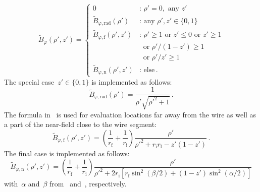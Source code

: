\begin{equation}
  \tilde{B}_\varphi (\rho', z') =
  \begin{cases}
    0                                            &:\, \rho' = 0 , \textrm{ any } z'      \\
    \tilde{B}_{\varphi,\mathrm{rad}} (\rho')     &:\, \textrm{any } \rho', z' \in \{0, 1\} \\
    \tilde{B}_{\varphi,\mathrm{f}}   (\rho', z') &:\, \rho' \geq 1 \textrm{ or } z' \leq 0 \textrm{ or } z' \geq 1 \\
                                            ~    & ~ \textrm{ or } \rho'/(1-z') \geq 1  \\
                                            ~    & ~ \textrm{ or } \rho'/z'   \geq 1 \\
    \tilde{B}_{\varphi,\mathrm{n}}   (\rho', z') &:\, \textrm{else} \, .
  \end{cases}
\end{equation}
The special case~$z' \in \{0, 1\}$ is implemented as follows:
\begin{equation}
  \tilde{B}_{\varphi,\mathrm{rad}} (\rho') = \frac{1}{\rho' \sqrt{{\rho'}^2 + 1}} \, .
\end{equation}
The formula in~ is used for evaluation locations far away from the wire
as well as a part of the near-field close to the wire segment:
\begin{equation}
  \tilde{B}_{\varphi,\mathrm{f}} (\rho', z')
  = \left(\frac{1}{r_\mathrm{f}} + \frac{1}{r_\mathrm{i}} \right)
    \frac{\rho'}{{\rho'}^2 + r_\mathrm{i} r_\mathrm{f} - z' (1 - z')} \, .
\end{equation}
The final case is implemented as follows:
\begin{equation}
  \tilde{B}_{\varphi,\mathrm{n}} (\rho', z')
  = \left(\frac{1}{r_\mathrm{f}} + \frac{1}{r_\mathrm{i}} \right)
    \frac{\rho'}
         {{\rho'}^2 + 2 r_\mathrm{i} \left[ r_\mathrm{f} \sin^2(\beta/2) + (1 - z') \sin^2(\alpha/2) \right]}
\end{equation}
with~$\alpha$ and~$\beta$ from~ and~, respectively.

